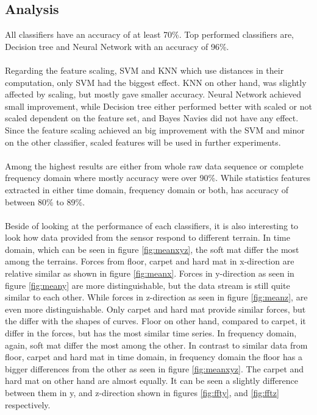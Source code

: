 \documentclass[USenglish]{ifimaster}  %
\begin{document}
\subsection{Analysis}
All classifiers have an accuracy of at least 70\%. Top performed classifiers are, Decision tree and Neural Network with an accuracy of 96\%. 
\\
\\
Regarding the feature scaling, SVM and KNN which use distances in their computation, only SVM had the biggest effect. KNN on other hand, was slightly affected by scaling, but mostly gave smaller accuracy. Neural Network achieved small improvement, while Decision tree either performed better with scaled or not scaled dependent on the feature set, and Bayes Navies did not have any effect. Since the feature scaling achieved an big improvement with the SVM and minor on the other classifier, scaled features will be used in further experiments.
\\
\\
Among the highest results are either from whole raw data sequence or complete frequency domain where mostly accuracy were over 90\%. While statistics features extracted in either time domain, frequency domain or both, has accuracy of between 80\% to 89\%.
\\
\\
Beside of looking at the performance of each classifiers, it is also interesting to look how data provided from the sensor respond to different terrain. In time domain, which can be seen in figure \ref{fig:meanxyz}, the soft mat differ the most among the terrains. Forces from floor, carpet and hard mat in x-direction are relative similar as shown in figure \ref{fig:meanx}. Forces in y-direction as seen in figure \ref{fig:meany} are more distinguishable, but the data stream is still quite similar to each other. While forces in z-direction as seen in figure \ref{fig:meanz}, are even more distinguishable. Only carpet and hard mat provide similar forces, but the differ with the shapes of curves. Floor on other hand, compared to carpet, it differ in the forces, but has the most similar time series. In frequency domain, again, soft mat differ the most among the other. In contrast to similar data from floor, carpet and hard mat in time domain, in frequency domain the floor has a bigger differences from the other as seen in figure \ref{fig:meanxyz}. The carpet and hard mat on other hand are almost equally. It can be seen a slightly difference between them in y, and z-direction shown in figures \ref{fig:ffty}, and \ref{fig:fftz} respectively.
\end{document}
